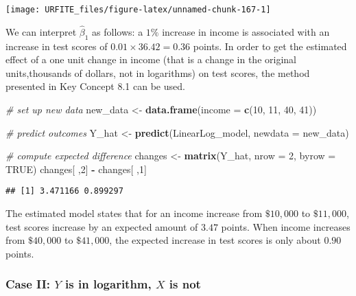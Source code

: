 \documentclass[]{book}
\newenvironment{Shaded}{\begin{snugshade}}{\end{snugshade}}
\newcommand{\KeywordTok}[1]{\textcolor[rgb]{0.13,0.29,0.53}{\textbf{#1}}}
\newcommand{\DataTypeTok}[1]{\textcolor[rgb]{0.13,0.29,0.53}{#1}}
\newcommand{\DecValTok}[1]{\textcolor[rgb]{0.00,0.00,0.81}{#1}}
\newcommand{\StringTok}[1]{\textcolor[rgb]{0.31,0.60,0.02}{#1}}
\newcommand{\CommentTok}[1]{\textcolor[rgb]{0.56,0.35,0.01}{\textit{#1}}}
\newcommand{\OtherTok}[1]{\textcolor[rgb]{0.56,0.35,0.01}{#1}}
\newcommand{\OperatorTok}[1]{\textcolor[rgb]{0.81,0.36,0.00}{\textbf{#1}}}
\newcommand{\NormalTok}[1]{#1}
\theoremstyle{definition}
\theoremstyle{definition}
\theoremstyle{definition}
\theoremstyle{remark}
\begin{document}
\begin{center}\texttt{[image: URFITE\_files/figure-latex/unnamed-chunk-167-1]} \end{center}

We can interpret \(\hat{\beta}_1\) as follows: a \(1\%\) increase in
income is associated with an increase in test scores of
\(0.01 \times 36.42 = 0.36\) points. In order to get the estimated
effect of a one unit change in income (that is a change in the original
units,thousands of dollars, not in logarithms) on test scores, the
method presented in Key Concept 8.1 can be used.

\begin{Shaded}
\begin{Highlighting}[]
\CommentTok{# set up new data}
\NormalTok{new_data <-}\StringTok{ }\KeywordTok{data.frame}\NormalTok{(}\DataTypeTok{income =} \KeywordTok{c}\NormalTok{(}\DecValTok{10}\NormalTok{, }\DecValTok{11}\NormalTok{, }\DecValTok{40}\NormalTok{, }\DecValTok{41}\NormalTok{))}

\CommentTok{# predict outcomes }
\NormalTok{Y_hat <-}\StringTok{ }\KeywordTok{predict}\NormalTok{(LinearLog_model, }\DataTypeTok{newdata =}\NormalTok{ new_data)}

\CommentTok{# compute expected difference}
\NormalTok{changes <-}\StringTok{ }\KeywordTok{matrix}\NormalTok{(Y_hat, }\DataTypeTok{nrow =} \DecValTok{2}\NormalTok{, }\DataTypeTok{byrow =} \OtherTok{TRUE}\NormalTok{)}
\NormalTok{changes[ ,}\DecValTok{2}\NormalTok{] }\OperatorTok{-}\StringTok{ }\NormalTok{changes[ ,}\DecValTok{1}\NormalTok{]}
\end{Highlighting}
\end{Shaded}

\begin{verbatim}
## [1] 3.471166 0.899297
\end{verbatim}

The estimated model states that for an income increase from \(\$10,000\)
to \(\$11,000\), test scores increase by an expected amount of \(3.47\)
points. When income increases from \(\$40,000\) to \(\$41,000\), the
expected increase in test scores is only about \(0.90\) points.

\subsubsection*{\texorpdfstring{Case II: \(Y\) is in logarithm, \(X\) is
not}{Case II: Y is in logarithm, X is not}}\label{case-ii-y-is-in-logarithm-x-is-not}
\end{document}
